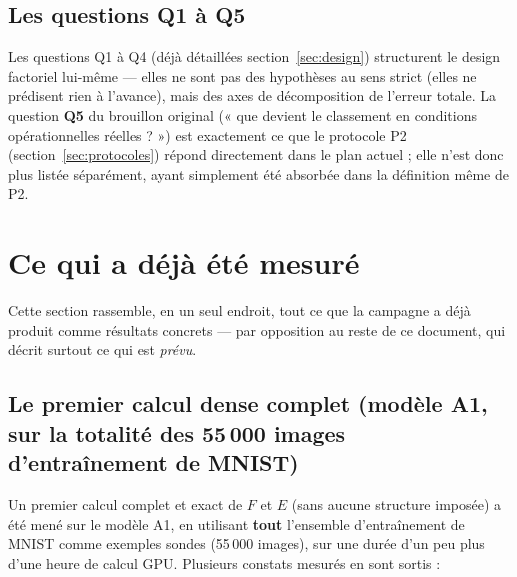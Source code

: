 \documentclass[11pt,a4paper]{article}
\begin{document}
\subsection*{Les questions Q1 à Q5}

Les questions Q1 à Q4 (déjà détaillées section~\ref{sec:design}) structurent le design factoriel
lui-même — elles ne sont pas des hypothèses au sens strict (elles ne prédisent rien à l'avance),
mais des axes de décomposition de l'erreur totale. La question \textbf{Q5} du brouillon original
(« que devient le classement en conditions opérationnelles réelles ? ») est exactement ce que le
protocole P2 (section~\ref{sec:protocoles}) répond directement dans le plan actuel ; elle n'est donc
plus listée séparément, ayant simplement été absorbée dans la définition même de P2.

\section{Ce qui a déjà été mesuré}
\label{sec:mesures}

Cette section rassemble, en un seul endroit, tout ce que la campagne a déjà produit comme résultats
concrets — par opposition au reste de ce document, qui décrit surtout ce qui est \emph{prévu}.

\subsection{Le premier calcul dense complet (modèle A1, sur la totalité des 55\,000 images d'entraînement de MNIST)}

Un premier calcul complet et exact de $F$ et $\hat E$ (sans aucune structure imposée) a été mené sur
le modèle A1, en utilisant \textbf{tout} l'ensemble d'entraînement de MNIST comme exemples sondes
(55\,000 images), sur une durée d'un peu plus d'une heure de calcul GPU. Plusieurs constats mesurés
en sont sortis :
\end{document}
